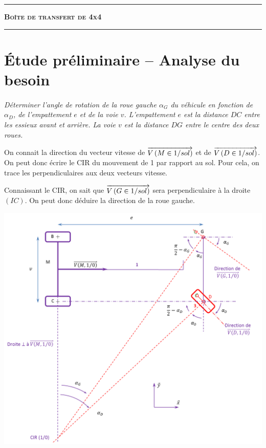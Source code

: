 \documentclass[11pt,oneside]{article}
\begin{document}
\vspace{0.5cm}




\noindent\rule{\linewidth}{.2pt}
\begin{center}
 \LARGE\textbf{\textsc{Boîte de transfert de 4x4}}
\end{center}
\noindent\rule{\linewidth}{.2pt}



\section{Étude préliminaire -- Analyse du besoin}

\paragraph{}
\textit{Déterminer l'angle de rotation de la roue gauche $\alpha_G$ du véhicule en fonction de $\alpha_D$, de l'empattement $e$ et de la voie $v$. L'empattement $e$ est la distance $DC$ entre les essieux avant et arrière. La voie $v$ est la distance $DG$ entre le centre des deux roues.}

On connait la direction du vecteur vitesse de $\overrightarrow{V\left( {M} \in {1}/{sol}\right)}$ et de $\overrightarrow{V\left( {D} \in {1}/{sol}\right)}$. On peut donc écrire le CIR du mouvement de 1 par rapport au sol. Pour cela, on trace les perpendiculaires aux deux vecteurs vitesse. 

Connaissant le CIR, on sait que $\overrightarrow{V\left( {G} \in {1}/{sol}\right)}$ sera perpendiculaire à la droite $(IC)$. On peut donc déduire la direction de la roue gauche. 

\begin{center}
\includegraphics[width=.8\textwidth]{png/angle_roue}
\end{center}
\end{document}
